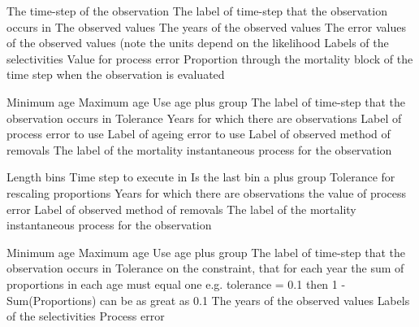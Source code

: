  {The time-step of the observation}
 {The label of time-step that the observation occurs in}
 {The observed values}
 {The years of the observed values}
 {The error values of the observed values (note the units depend on the likelihood}
 {Labels of the selectivities}
 {Value for process error}
 {Proportion through the mortality block of the time step when the observation is evaluated}
\par\textbf{}\par
{} {Minimum age}
 {Maximum age}
 {Use age plus group}
 {The label of time-step that the observation occurs in}
 {Tolerance}
 {Years for which there are observations}
 {Label of process error to use}
 {Label of ageing error to use}
 {Label of observed method of removals}
 {The label of the mortality instantaneous process for the observation}
\par\textbf{}\par
{} {Length bins}
 {Time step to execute in}
 {Is the last bin a plus group}
 {Tolerance for rescaling proportions}
 {Years for which there are observations}
 {the value of process error}
 {Label of observed method of removals}
 {The label of the mortality instantaneous process for the observation}
\par\textbf{}\par
{} {Minimum age}
 {Maximum age}
 {Use age plus group}
 {The label of time-step that the observation occurs in}
 {Tolerance on the constraint, that for each year the sum of proportions in each age must equal one e.g. tolerance = 0.1 then 1 - Sum(Proportions) can be as great as 0.1}
 {The years of the observed values}
 {Labels of the selectivities}
 {Process error}

